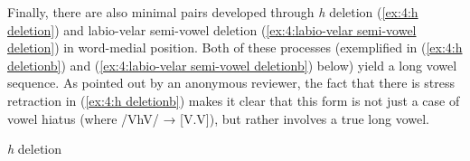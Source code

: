     \z
\z

Finally, there are also minimal pairs developed through \textit{h} deletion (\ref{ex:4:h deletion}) and labio-velar semi-vowel deletion (\ref{ex:4:labio-velar semi-vowel deletion}) in word-medial position. Both of these processes (exemplified in (\ref{ex:4:h deletionb}) and (\ref{ex:4:labio-velar semi-vowel deletionb}) below) yield a long vowel sequence. As pointed out by an anonymous reviewer, the fact that there is stress retraction in (\ref{ex:4:h deletionb}) makes it clear that this form is not just a case of vowel hiatus (where /VhV/ → [V.V]), but rather involves a true long vowel.

\ea\label{ex:4:h deletion}
{\textit{h} deletion}

    \label{ex:4:h deletiona}
        \label{ex:4:h deletionb}
    \z
\z

